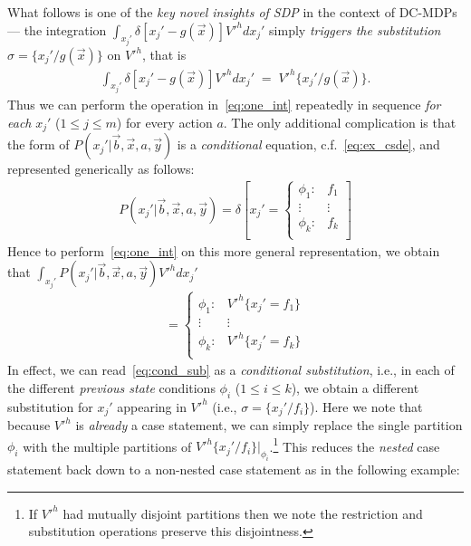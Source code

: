 \documentclass[letterpaper]{article}
\begin{document}
\begin{enumerate}
What follows is one of the \emph{key novel insights of SDP} in the context of
DC-MDPs --- the integration 
$\int_{x_j'} \delta[x_j' - g(\vec{x})] V'^{h} dx_j'$ 
simply \emph{triggers the substitution} $\sigma = \{ x_j' / g(\vec{x}) \}$
on $V'^{h}$, that is
\begin{align}
\int_{x_j'} \delta[x_j' - g(\vec{x})] V'^{h} dx_j' \; = \; V'^{h} \{x_j' / g(\vec{x}) \} . \label{eq:one_int}
\end{align}
Thus we can perform the
operation in~\eqref{eq:one_int} repeatedly in sequence \emph{for each}
$x_j'$ ($1 \leq j \leq m$) for every action $a$.  The only
additional complication is that the form of 
$P(x_j'|\vec{b},\vec{x},a,\vec{y})$ is a \emph{conditional} 
equation, c.f.~\eqref{eq:ex_csde}, and represented generically
as follows:
\begin{align}
   P(x_j'|\vec{b},\vec{x},a,\vec{y}) = \delta\left[ x_j' = \begin{cases}
    \phi_1: & f_1 \\ 
   \vdots&\vdots\\ 
    \phi_k: & f_k \\ 
  \end{cases} \right] \label{eq:cond_sub}
\end{align}
Hence to perform~\eqref{eq:one_int} on this more general
representation, we obtain that $\int_{x_j'} P(x_j'|\vec{b},\vec{x},a,\vec{y}) V'^{h} dx_j'$
\begin{align*}
    = \begin{cases}
    \phi_1: & V'^{h} \{ x_j' = f_1 \} \\ 
   \vdots&\vdots\\ 
    \phi_k: & V'^{h} \{ x_j' = f_k \}  \\ 
  \end{cases}
\end{align*}
In effect, we can read~\eqref{eq:cond_sub} as a \emph{conditional
substitution}, i.e., in each of the different \emph{previous state}
conditions $\phi_i$ ($1 \leq i \leq k$), we obtain a different
substitution for $x_j'$ appearing in $V'^{h}$ (i.e., $\sigma = \{ x_j' / f_i
\}$).  Here we note that because $V'^{h}$ is \emph{already} a case
statement, we can simply replace the single partition $\phi_i$ with the
multiple partitions of $V'^h \{ x_j' / f_i \}|_{\phi_i}$.\footnote{If $V'^h$
had mutually disjoint partitions then we note the restriction and
substitution operations preserve this disjointness.}  This reduces
the \emph{nested} case statement back down to a non-nested case
statement as in the following example:

\end{enumerate}
\end{document}
